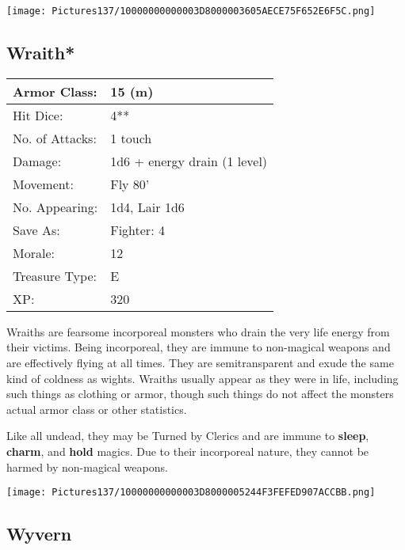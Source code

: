 \documentclass[a4paper,twoside,openany,10pt]{book}
\begin{document}
\begin{multicols}{2}
\begin{center} \texttt{[image: Pictures137/10000000000003D8000003605AECE75F652E6F5C.png]} \end{center}


\subsection*{Wraith*}\label{wraith}

\begin{tabularx}{0.50\textwidth}{@{}lX@{}}
Armor Class: & 15 (m) \\\hline
Hit Dice: & 4** \\\hline
No. of Attacks: & 1 touch \\\hline
Damage: & 1d6 + energy drain (1 level) \\\hline
Movement: & Fly 80' \\\hline
No. Appearing: & 1d4, Lair 1d6 \\\hline
Save As: & Fighter: 4 \\\hline
Morale: & 12 \\\hline
Treasure Type: & E \\\hline
XP: & 320 \\\hline
\end{tabularx}\medskip

Wraiths are fearsome incorporeal monsters who drain the very life energy from their victims. Being incorporeal, they are immune to non-magical weapons and are effectively flying at all times. They are semitransparent and exude the same kind of coldness as wights. Wraiths usually appear as they were in life, including such things as clothing or armor, though such things do not affect the monsters actual armor class or other statistics.

Like all undead, they may be Turned by Clerics and are immune to \textbf{sleep}, \textbf{charm},\textbf{ }and \textbf{hold} magics. Due to their incorporeal nature, they cannot be harmed by non-magical weapons.

\begin{center} \texttt{[image: Pictures137/10000000000003D8000005244F3FEFED907ACCBB.png]} \end{center}

\subsection*{Wyvern}\label{wyvern}


\end{multicols}
\end{document}
